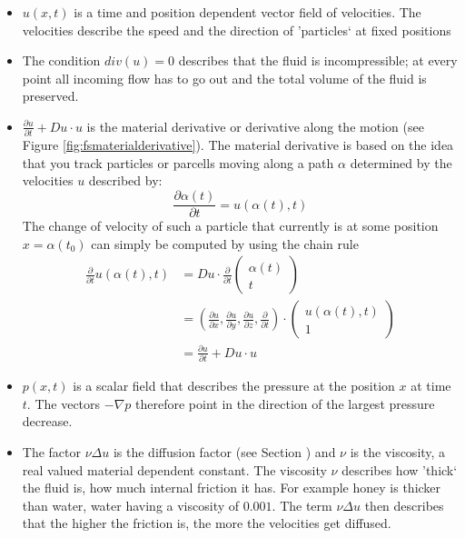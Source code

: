 \begin{itemize}
	\item $u(x,t)$ is a time and position dependent vector field of velocities. The velocities describe the speed and the direction of 'particles` at fixed positions
	\item The condition $div(u) = 0$ describes that the fluid is incompressible; at every point all incoming flow has to go out and the total volume of the fluid is preserved.
	\item $\frac{\partial u}{\partial t} + D u \cdot u$ is the material derivative or derivative along the motion (see Figure \ref{fig:fsmaterialderivative}). The material derivative is based on the idea that you track particles or parcells moving along a path $\alpha$ determined by the velocities $u$ described by:
\[\frac{\partial \alpha(t)}{\partial t} = u(\alpha(t), t)\]
The change of velocity of such a particle that currently is at some position $x = \alpha(t_0)$ can simply be computed by using the chain rule 
\begin{align*}\frac{\partial}{\partial t} u(\alpha(t),t) &= Du \cdot \frac{\partial}{\partial t}\begin{pmatrix}
\alpha(t) \\
t
\end{pmatrix}\\
&= (\frac{\partial u}{\partial x}, \frac{\partial u}{\partial y},\frac{\partial u}{\partial z}, \frac{\partial }{\partial t}) \cdot \begin{pmatrix}
u(\alpha(t),t) \\
1
\end{pmatrix} \\
&= \frac{\partial u}{\partial t} + Du \cdot u
\end{align*}
\item $p(x,t)$ is a scalar field that describes the pressure at the position $x$ at time $t$. The vectors $-\nabla p$ therefore point in the direction of the largest pressure decrease.
\item The factor $\nu \Delta u$ is the diffusion factor (see Section ) and $\nu$ is the viscosity, a real valued material dependent constant. The viscosity $\nu$ describes how 'thick` the fluid is, how much internal friction it has. For example honey is thicker than water, water having a viscosity of $0.001$. The term $\nu \Delta u$ then describes that the higher the friction is, the more the velocities get diffused.
\end{itemize}

